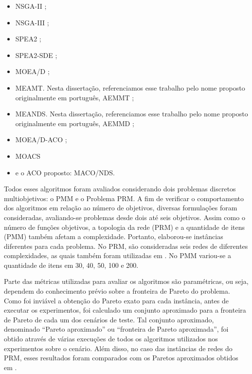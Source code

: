 \acresetall
\begin{itemize}
	\item \ac{NSGA-II} \cite{Deb2002};
	\item \ac{NSGA-III} \cite{Deb2014};
	\item \ac{SPEA2} \cite{Zitzler2002};
	\item \ac{SPEA2-SDE} \cite{Spea2SDE};
	\item \ac{MOEA/D} \cite{Zhang2007};
	\item \ac{MEAMT}. Nesta dissertação, referenciamos esse trabalho pelo nome proposto originalmente em português, \ac{AEMMT} \cite{Brasil2013};
	\item \ac{MEANDS}. Nesta dissertação, referenciamos esse trabalho pelo nome proposto originalmente em português, \ac{AEMMD} \cite{Lafeta2017};
	\item \ac{MOEA/D-ACO} \cite{Ke2013};
	\item \ac{MOACS} \cite{Riveros2016}
	\item e o ACO proposto: \ac{MACO/NDS}.
\end{itemize}

Todos esses algoritmos foram avaliados considerando dois problemas discretos multiobjetivos: o \ac{PMM} e o Problema \ac{PRM}. A fim  de verificar o comportamento dos algoritmos em relação ao número de objetivos, diversas formulações foram consideradas, avaliando-se problemas desde dois até seis objetivos. Assim como o número de funções objetivos, a topologia da rede (PRM) e a quantidade de itens (PMM) também afetam a complexidade. Portanto, elaborou-se instâncias diferentes para cada problema. No PRM, são consideradas seis redes de diferentes complexidades, as quais também foram utilizadas em \cite{LafetaThesis}. No PMM variou-se a quantidade de itens em 30, 40, 50, 100 e 200.

Parte das métricas utilizadas para avaliar os algoritmos são paramétricas, ou seja, dependem do conhecimento prévio sobre a fronteira de Pareto do problema. Como foi inviável a obtenção do Pareto exato para cada instância, antes de executar os experimentos, foi calculado um conjunto aproximado para a fronteira de Pareto de cada um dos cenários de teste. Tal conjunto aproximado, denominado ``Pareto aproximado'' ou ``fronteira de Pareto aproximada'', foi obtido através de várias execuções de todos os algoritmos utilizados nos experimentos sobre o cenário. Além disso, no caso das instâncias de redes do PRM, esses resultados foram comparados com os Paretos aproximados obtidos em \cite{Lafeta2017}.

